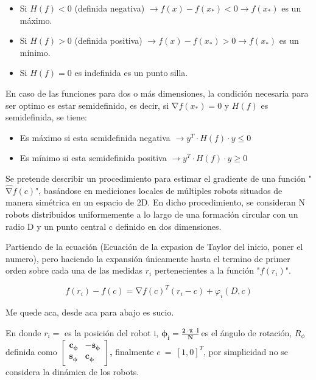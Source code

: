 \begin{itemize}
	\item Si ${H}\left(f\right)<0$ (definida negativa) $\rightarrow{f}\left(x\right)-f\left(x_{*}\right)<0\rightarrow{f}\left(x_{*}\right)$ es un máximo.
	\item Si ${H}\left(f\right)>0$ (definida positiva) $\rightarrow{f}\left(x\right)-f\left(x_{*}\right)>0\rightarrow{f}\left(x_{*}\right)$ es un mínimo.
	\item Si ${H}\left(f\right)=0$ es indefinida es un punto silla.
\end{itemize}

En caso de las funciones para dos o más dimensiones, la condición necesaria para ser optimo es estar semidefinido, es decir, si $\mathrm{\nabla}{f}{\left(x_{*}\right)}=0$ y ${H}\left(f\right)$ es semidefinida, se tiene:

\begin{itemize}
	\item Es máximo si esta semidefinida negativa $\rightarrow{y}^{T}\cdot{H}\left({f}\right)\cdot{y}\leq{0}$
	\item Es mínimo si esta semidefinida positiva $\rightarrow{y}^{T}\cdot{H}\left({f}\right)\cdot{y}\geq{0}$
\end{itemize}

Se pretende describir un procedimiento para estimar el gradiente de una función "$\widehat{\mathrm{\nabla }}{f}\left(c\right)$", basándose en mediciones locales de múltiples robots situados de manera simétrica en un espacio de 2D. En dicho procedimiento, se consideran N robots distribuidos uniformemente a lo largo de una formación circular con un radio D y un punto central c definido en dos dimensiones.

Partiendo de la ecuación (Ecuación de la expasion de Taylor del inicio, poner el numero), pero haciendo la expansión únicamente hasta el termino de primer orden sobre cada una de las medidas $r_i$ pertenecientes a la función "${f}\left({r}_{i}\right)$".

\begin{equation*}
	f\left(r_{i}\right)-f\left(c\right)=\mathrm{\nabla}{f}\left(c\right)^{T}\left(r_{i}-c\right)+\varphi_{i}\left(D,c\right)
\end{equation*}

Me quede aca, desde aca para abajo es sucio.

En donde $r_{i}=$ es la posición del robot i, ${\boldsymbol{\phi }}_{\boldsymbol{i}}\boldsymbol{=}\frac{\boldsymbol{2}\cdot\boldsymbol{\pi }\cdot\boldsymbol{i}}{\boldsymbol{N}}\boldsymbol{\ }$es el ángulo de rotación, $R_{\phi }$  definida como \textbf{ }$\left[ \begin{array}{cc} {\boldsymbol{c}}_{\boldsymbol{\phi }} & \boldsymbol{-}{\boldsymbol{s}}_{\boldsymbol{\phi }} \\  {\boldsymbol{s}}_{\boldsymbol{\phi }} & {\boldsymbol{c}}_{\boldsymbol{\phi }} \end{array} \right]$\textbf{, }finalmente $e\ =\ {\left[1,0\right]}^T$, por simplicidad no se considera la dinámica de los robots.



